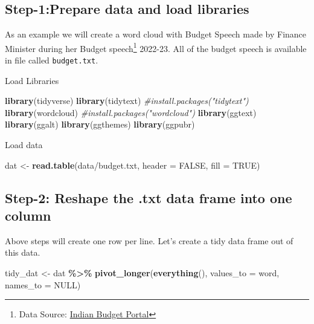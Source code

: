 \documentclass[
]{book}
\newenvironment{Shaded}{\begin{snugshade}}{\end{snugshade}}
\newcommand{\AttributeTok}[1]{\textcolor[rgb]{0.13,0.29,0.53}{#1}}
\newcommand{\CommentTok}[1]{\textcolor[rgb]{0.56,0.35,0.01}{\textit{#1}}}
\newcommand{\ConstantTok}[1]{\textcolor[rgb]{0.56,0.35,0.01}{#1}}
\newcommand{\FunctionTok}[1]{\textcolor[rgb]{0.13,0.29,0.53}{\textbf{#1}}}
\newcommand{\NormalTok}[1]{#1}
\newcommand{\OtherTok}[1]{\textcolor[rgb]{0.56,0.35,0.01}{#1}}
\newcommand{\SpecialCharTok}[1]{\textcolor[rgb]{0.81,0.36,0.00}{\textbf{#1}}}
\newcommand{\StringTok}[1]{\textcolor[rgb]{0.31,0.60,0.02}{#1}}
\begin{document}
\hypertarget{step-1prepare-data-and-load-libraries}{%
\subsection{Step-1:Prepare data and load libraries}\label{step-1prepare-data-and-load-libraries}}

As an example we will create a word cloud with Budget Speech made by Finance Minister during her Budget speech\footnote{Data Source: \href{https://www.indiabudget.gov.in/}{Indian Budget Portal}} 2022-23. All of the budget speech is available in file called \texttt{budget.txt}.

Load Libraries

\begin{Shaded}
\begin{Highlighting}[]
\FunctionTok{library}\NormalTok{(tidyverse)}
\FunctionTok{library}\NormalTok{(tidytext) }\CommentTok{\#install.packages("tidytext")}
\FunctionTok{library}\NormalTok{(wordcloud) }\CommentTok{\#install.packages("wordcloud")}
\FunctionTok{library}\NormalTok{(ggtext)}
\FunctionTok{library}\NormalTok{(ggalt)}
\FunctionTok{library}\NormalTok{(ggthemes)}
\FunctionTok{library}\NormalTok{(ggpubr)}
\end{Highlighting}
\end{Shaded}

Load data

\begin{Shaded}
\begin{Highlighting}[]
\NormalTok{dat }\OtherTok{\textless{}{-}} \FunctionTok{read.table}\NormalTok{(}\StringTok{\textquotesingle{}data/budget.txt\textquotesingle{}}\NormalTok{, }\AttributeTok{header =} \ConstantTok{FALSE}\NormalTok{, }\AttributeTok{fill =} \ConstantTok{TRUE}\NormalTok{)}
\end{Highlighting}
\end{Shaded}

\hypertarget{step-2-reshape-the-.txt-data-frame-into-one-column}{%
\subsection{Step-2: Reshape the .txt data frame into one column}\label{step-2-reshape-the-.txt-data-frame-into-one-column}}

Above steps will create one row per line. Let's create a tidy data frame out of this data.

\begin{Shaded}
\begin{Highlighting}[]
\NormalTok{tidy\_dat }\OtherTok{\textless{}{-}}\NormalTok{ dat }\SpecialCharTok{\%\textgreater{}\%} 
  \FunctionTok{pivot\_longer}\NormalTok{(}\FunctionTok{everything}\NormalTok{(), }\AttributeTok{values\_to =} \StringTok{\textquotesingle{}word\textquotesingle{}}\NormalTok{, }\AttributeTok{names\_to =} \ConstantTok{NULL}\NormalTok{)}
\end{Highlighting}
\end{Shaded}
\end{document}
